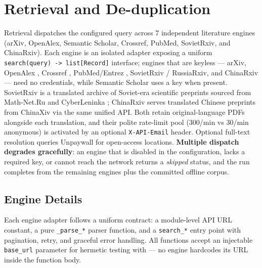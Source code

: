 \documentclass[
  english,
]{article}
\begin{document}
\newpage

\section{Retrieval and
De-duplication}\label{retrieval-and-de-duplication}

Retrieval dispatches the configured query across 7 independent
literature engines (arXiv, OpenAlex, Semantic Scholar, Crossref, PubMed,
SovietRxiv, and ChinaRxiv). Each engine is an isolated adapter exposing
a uniform \texttt{search(query)\ -\textgreater{}\ list{[}Record{]}}
interface; engines that are keyless --- arXiv, OpenAlex
\citep{priem2022openalex}, Crossref \citep{hendricks2020crossref},
PubMed/Entrez \citep{sayers2022entrez}, SovietRxiv / RussiaRxiv, and
ChinaRxiv --- need no credentials, while Semantic Scholar
\citep{kinney2023semantic} uses a key when present. SovietRxiv is a
translated archive of Soviet-era scientific preprints sourced from
Math-Net.Ru and CyberLeninka \citep{sovietrxiv}; ChinaRxiv serves
translated Chinese preprints from ChinaXiv via the same unified API.
Both retain original-language PDFs alongside each translation, and their
polite rate-limit pool (300/min vs 30/min anonymous) is activated by an
optional \texttt{X-API-Email} header. Optional full-text resolution
queries Unpaywall \citep{piwowar2018state} for open-access locations.
\textbf{Multiple dispatch degrades gracefully}: an engine that is
disabled in the configuration, lacks a required key, or cannot reach the
network returns a \emph{skipped} status, and the run completes from the
remaining engines plus the committed offline corpus.

\subsection{Engine Details}\label{engine-details}

Each engine adapter follows a uniform contract: a module-level API URL
constant, a pure \texttt{\_parse\_*} parser function, and a
\texttt{search\_*} entry point with pagination, retry, and graceful
error handling. All functions accept an injectable \texttt{base\_url}
parameter for hermetic testing with  --- no
engine hardcodes its URL inside the function body.
\end{document}

